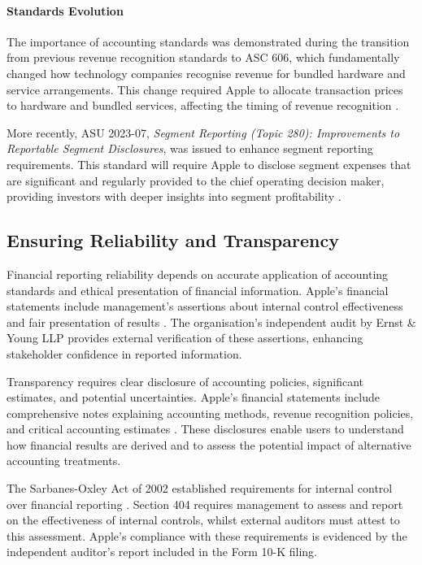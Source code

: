 \documentclass[12pt,a4paper]{article}
\begin{document}
\paragraph{Standards Evolution}

The importance of accounting standards was demonstrated during the transition from previous revenue recognition standards to ASC 606, which fundamentally changed how technology companies recognise revenue for bundled hardware and service arrangements. This change required Apple to allocate transaction prices to hardware and bundled services, affecting the timing of revenue recognition \citep{apple202410k}.

More recently, ASU 2023-07, \textit{Segment Reporting (Topic 280): Improvements to Reportable Segment Disclosures}, was issued to enhance segment reporting requirements. This standard will require Apple to disclose segment expenses that are significant and regularly provided to the chief operating decision maker, providing investors with deeper insights into segment profitability \citep{fasb2023}.

\subsection{Ensuring Reliability and Transparency}

Financial reporting reliability depends on accurate application of accounting standards and ethical presentation of financial information. Apple's financial statements include management's assertions about internal control effectiveness and fair presentation of results \citep{apple202410k}. The organisation's independent audit by Ernst \& Young LLP provides external verification of these assertions, enhancing stakeholder confidence in reported information.

Transparency requires clear disclosure of accounting policies, significant estimates, and potential uncertainties. Apple's financial statements include comprehensive notes explaining accounting methods, revenue recognition policies, and critical accounting estimates \citep{apple202410k}. These disclosures enable users to understand how financial results are derived and to assess the potential impact of alternative accounting treatments.

The Sarbanes-Oxley Act of 2002 established requirements for internal control over financial reporting \citep{sox2002}. Section 404 requires management to assess and report on the effectiveness of internal controls, whilst external auditors must attest to this assessment. Apple's compliance with these requirements is evidenced by the independent auditor's report included in the Form 10-K filing.
\end{document}
